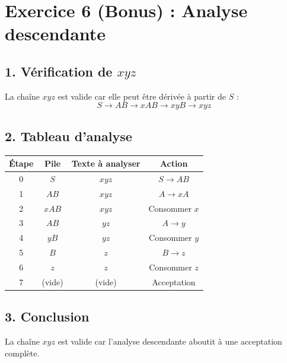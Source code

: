 \documentclass[12pt]{article}
\begin{document}
\section*{Exercice 6 (Bonus) : Analyse descendante}

\subsection*{1. Vérification de \(x y z\)}
La chaîne \(x y z\) est valide car elle peut être dérivée à partir de \(S\) :
\[
S \rightarrow A B \rightarrow x A B \rightarrow x y B \rightarrow x y z
\]

\subsection*{2. Tableau d'analyse}
\begin{tabular}{|c|c|c|c|}
\hline
Étape & Pile & Texte à analyser & Action \\
\hline
0 & \(S\) & \(x y z\) & \(S \rightarrow A B\) \\
1 & \(A B\) & \(x y z\) & \(A \rightarrow x A\) \\
2 & \(x A B\) & \(x y z\) & Consommer \(x\) \\
3 & \(A B\) & \(y z\) & \(A \rightarrow y\) \\
4 & \(y B\) & \(y z\) & Consommer \(y\) \\
5 & \(B\) & \(z\) & \(B \rightarrow z\) \\
6 & \(z\) & \(z\) & Consommer \(z\) \\
7 & (vide) & (vide) & Acceptation \\
\hline
\end{tabular}

\subsection*{3. Conclusion}
La chaîne \(x y z\) est valide car l'analyse descendante aboutit à une acceptation complète.
\end{document}
